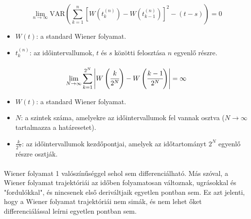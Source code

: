 \documentclass[11pt,a4pape,draftr]{article}
\begin{document}
				\paragraph{}
					$$
					\lim_{n \to \infty} \text{VAR} \left( \sum_{k=1}^{n} \left[ W\left(t_k^{(n)}\right) - W\left(t_{k-1}^{(n)}\right) \right]^2 - (t-s) \right) = 0
					$$
					\begin{itemize}
						\item $W(t)$: a standard Wiener folyamat.
						\item $t_k^{(n)}$: az időintervallumok, $t$ és $s$ közötti felosztása $n$ egyenlő részre.
					\end{itemize}
				\paragraph{}
					$$\lim_{N \to \infty} \sum_{k=1}^{2^N}\left| W \left( \cfrac{k}{2^N}\right) - W \left( \cfrac{k-1}{2^N}\right) \right| = \infty$$
					\begin{itemize}
						\item $W(t)$: a standard Wiener folyamat.
						\item $N$: a szintek száma, amelyekre az időintervallumok fel vannak osztva ($N \to \infty$ tartalmazza a határesetet).
						\item $\frac{k}{2^N}$: az időintervallumok kezdőpontjai, amelyek az időtartományt $2^N$ egyenlő részre osztják.
					\end{itemize}
				\paragraph{}
					Wiener folyamat 1 valószínűséggel sehol sem differenciálható. Más szóval, a Wiener folyamat trajektóriái az időben folyamatosan változnak, ugrásokkal és "fordulókkal", és nincsenek első deriváltjaik egyetlen pontban sem. Ez azt jelenti, hogy a Wiener folyamat trajektóriái nem simák, és nem lehet őket differenciálással leírni egyetlen pontban sem.
\end{document}
